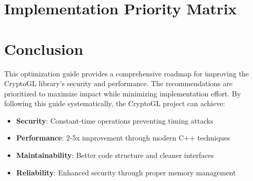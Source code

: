 \documentclass[11pt,a4paper]{article}
\begin{document}
\section{Implementation Priority Matrix}

\begin{table}[h]
\centering
{}
\caption{Optimization Priority Matrix}
\end{table}

\section{Conclusion}

This optimization guide provides a comprehensive roadmap for improving the CryptoGL library's security and performance. The recommendations are prioritized to maximize impact while minimizing implementation effort. By following this guide systematically, the CryptoGL project can achieve:

\begin{itemize}
    \item \textbf{Security}: Constant-time operations preventing timing attacks
    \item \textbf{Performance}: 2-5x improvement through modern C++ techniques
    \item \textbf{Maintainability}: Better code structure and cleaner interfaces
    \item \textbf{Reliability}: Enhanced security through proper memory management
\end{itemize}
\end{document}
